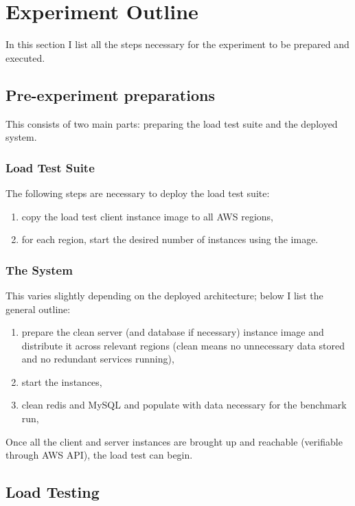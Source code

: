 \documentclass{uvamscse}
\begin{document}
\section{Experiment Outline}

In this section I list all the steps necessary for the experiment to be prepared and executed.

\subsection{Pre-experiment preparations}

This consists of two main parts: preparing the load test suite and the deployed system.

\subsubsection{Load Test Suite}

The following steps are necessary to deploy the load test suite:
\begin{enumerate}
  \item copy the load test client instance image to all AWS regions,
  \item for each region, start the desired number of instances using the image.
\end{enumerate}

\subsubsection{The System}

This varies slightly depending on the deployed architecture; below I list the general outline:
\begin{enumerate}
  \item prepare the clean server (and database if necessary) instance image and distribute it across relevant regions (clean means no unnecessary data stored and no redundant services running),
  \item start the instances,
  \item clean redis and MySQL and populate with data necessary for the benchmark run,
\end{enumerate}

Once all the client and server instances are brought up and reachable (verifiable through AWS API), the load test can begin.

\subsection{Load Testing}\label{Load Testing}
\end{document}
